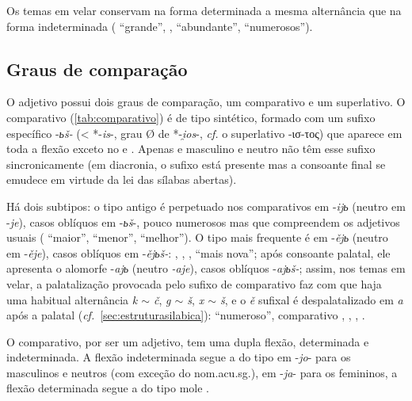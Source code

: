 Os temas em velar conservam na forma determinada a mesma alternância que
na forma indeterminada ( ``grande'',
 , 
``abundante'',  
``numerosos'').
\clearpage

\subsection{Graus de comparação}\label{sec:comparativo}

O adjetivo possui dois graus de comparação, um comparativo e um
superlativo. O comparativo (\autoref{tab:comparativo}) é de tipo sintético,
formado com
um sufixo específico -\emph{ьš-} (< *-\emph{is}-, grau Ø de
*-\emph{i̯os}-, \emph{cf.} o superlativo  -ισ-τος) que aparece
em toda a
flexão exceto no   e .
Apenas  e 
masculino e neutro não têm esse sufixo sincronicamente (em diacronia, o
sufixo está presente mas a consoante final se emudece em virtude da lei
das sílabas abertas).




Há dois subtipos: o tipo antigo é perpetuado nos comparativos em
-\emph{ijь} (neutro em -\emph{je}), casos oblíquos em -\emph{ьš}-, pouco
numerosos mas que compreendem os adjetivos usuais (
``maior'',  ``menor'', 
``melhor'').
O tipo mais frequente é em -\emph{ějь} (neutro em
-\emph{ěje}), casos oblíquos em -\emph{ějьš-}: ,
 ,  , 
 ``mais nova''; após consoante palatal, ele apresenta o
alomorfe -\emph{ajь} (neutro \emph{-aje}), casos oblíquos -\emph{ajьš-};
assim, nos temas em velar, a palatalização provocada pelo sufixo de
comparativo faz com que haja uma habitual alternância \emph{k
$\sim$ č}, \emph{g $\sim$ š}, \emph{x
$\sim$ š}, e o \emph{ě} sufixal é despalatalizado em \emph{a}
após a palatal (\emph{cf.}~\ref{sec:estruturasilabica}):  ``numeroso'',
comparativo ,  ,
 ,  .

O comparativo, por ser um adjetivo, tem uma dupla flexão, determinada e
indeterminada. A flexão indeterminada segue a do tipo em -\emph{jo}-
para os masculinos e neutros (com exceção do nom.acu.sg.), em
-\emph{ja}- para os femininos, a flexão determinada segue a do tipo mole
 .

